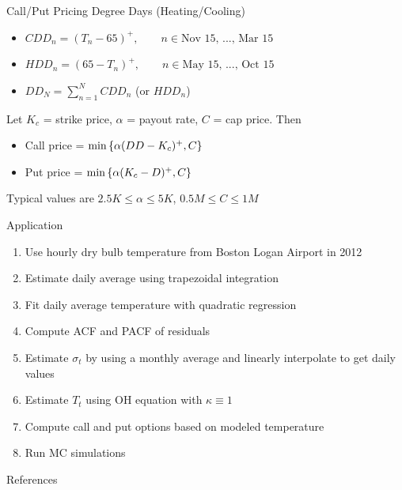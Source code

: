 \documentclass[8pt]{beamer}
\begin{document}
\begin{frame}{Call/Put Pricing \cite{gibert2024monte}}
	Degree Days (Heating/Cooling)
	\begin{itemize}
		\item $CDD_n = (T_n - 65)^+, \qquad n \in \text{Nov 15, ..., Mar 15}$
		\item $HDD_n = (65 - T_n)^+, \qquad n \in \text{May 15, ..., Oct 15}$
		\item $DD_N = \sum_{n =1}^N CDD_n $ (or $HDD_n$)
	
	\end{itemize}
	
	\vspace{10pt} 
	
	Let $K_c$ = strike price, $\alpha$ = payout rate, $C$ = cap price. Then 
	\begin{itemize}
		\item Call price = $\min \left \lbrace \alpha(DD - K_c)^+, C \right \rbrace$
		\item Put price = $\min \left \lbrace \alpha(K_c - D)^+, C \right \rbrace$
	\end{itemize}
	
	\vspace{10pt}
	
	Typical values are $2.5K \leq \alpha \leq 5K$, $0.5M \leq C \leq 1M$
	
	
	
\end{frame}


\begin{frame}{Application}
	\begin{enumerate}
		\item Use hourly dry bulb temperature from Boston Logan Airport in 2012
		\cite{NCEI2026}
		\item Estimate daily average using trapezoidal integration
		\item Fit daily average temperature with quadratic regression 
		\item Compute ACF and PACF of residuals
		\item Estimate $\sigma_t$ by using a monthly average and linearly interpolate to get daily values
		\item Estimate $T_t$ using OH equation with $\kappa \equiv 1$
		\item Compute call and put options based on modeled temperature
		\item Run MC simulations 
	\end{enumerate}
\end{frame}

\begin{frame}{References}
	\printbibliography
\end{frame}
\end{document}
